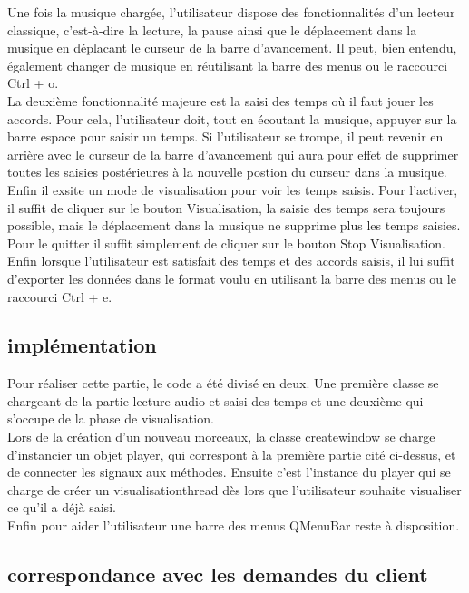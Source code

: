 \indent Une fois la musique chargée, l'utilisateur dispose des fonctionnalités d'un lecteur classique, c'est-à-dire la lecture, la pause ainsi que le déplacement dans la musique en déplacant le curseur de la barre d'avancement. Il peut, bien entendu, également changer de musique en réutilisant la barre des menus ou le raccourci Ctrl + o.
\\
\indent La deuxième fonctionnalité majeure est la saisi des temps où il faut jouer les accords. Pour cela, l'utilisateur doit, tout en écoutant la musique, appuyer sur la barre espace pour saisir un temps. Si l'utilisateur se trompe, il peut revenir en arrière avec le curseur de la barre d'avancement qui aura pour effet de supprimer toutes les saisies postérieures à la nouvelle postion du curseur dans la musique.
\\
\indent Enfin il exsite un mode de visualisation pour voir les temps saisis. Pour l'activer, il suffit de cliquer sur le bouton Visualisation, la saisie des temps sera toujours possible, mais le déplacement dans la musique ne supprime plus les temps saisies. Pour le quitter il suffit simplement de cliquer sur le bouton Stop Visualisation.
\\
\indent Enfin lorsque l'utilisateur est satisfait des temps et des accords saisis, il lui suffit d'exporter les données dans le format voulu en utilisant la barre des menus ou le raccourci Ctrl + e.

\subsection{implémentation}
\indent Pour réaliser cette partie, le code a été divisé en deux. Une première classe se chargeant de la partie lecture audio et saisi des temps et une deuxième qui s'occupe de la phase de visualisation.
\\
\indent Lors de la création d'un nouveau morceaux, la classe createwindow se charge d'instancier un objet player, qui correspont à la première partie cité ci-dessus, et de connecter les signaux aux méthodes. Ensuite c'est l'instance du player qui se charge de créer un visualisationthread dès lors que l'utilisateur souhaite visualiser ce qu'il a déjà saisi.
\\
Enfin pour aider l'utilisateur une barre des menus QMenuBar reste à disposition.
\subsection{correspondance avec les demandes du client}

